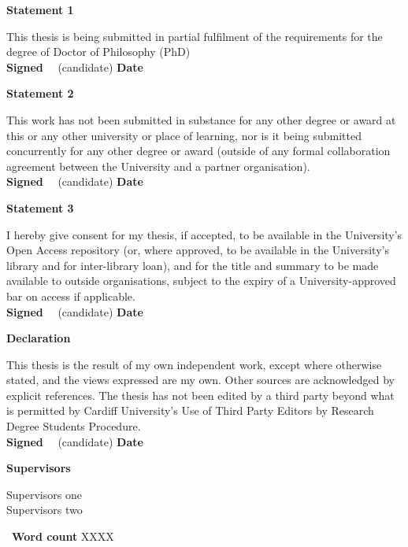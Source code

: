 \newpage\thispagestyle{empty}\cleardoublepage

\thispagestyle{plain}

\textbf{\large Statement 1}

This thesis is being submitted in partial fulfilment of the requirements for the degree of Doctor of Philosophy (PhD)\\
\textbf{Signed} \ \dotfill \ (candidate) \hspace*{1em} \textbf{Date}\ \ \ \dotfill

\textbf{\large Statement 2}

This work has not been submitted in substance for any other degree or award at this or any other university or place of learning, nor is it being submitted concurrently for any other degree or award (outside of any formal collaboration agreement between the University and a partner organisation).\\
\textbf{Signed} \ \dotfill \ (candidate) \hspace*{1em} \textbf{Date}\ \ \ \dotfill

\textbf{\large Statement 3}

I hereby give consent for my thesis, if accepted, to be available in the University's Open Access repository (or, where approved, to be available in the University's library and for inter-library loan), and for the title and summary to be made available to outside organisations, subject to the expiry of a University-approved bar on access if applicable.\\
\textbf{Signed} \ \dotfill \ (candidate) \hspace*{1em} \textbf{Date}\ \ \ \dotfill

\textbf{\large Declaration}

This thesis is the result of my own independent work, except where otherwise stated, and the views expressed are my own. Other sources are acknowledged by explicit references. The thesis has not been edited by a third party beyond what is permitted by Cardiff University's Use of Third Party Editors by Research Degree Students Procedure.\\
\textbf{Signed} \ \dotfill \ (candidate) \hspace*{1em} \textbf{Date}\ \ \ \dotfill

\vfill

\textbf{Supervisors} \ \parbox[t]{0.5\linewidth}{Supervisors one\\Supervisors two}  \ \hfill \textbf{Word count} XXXX